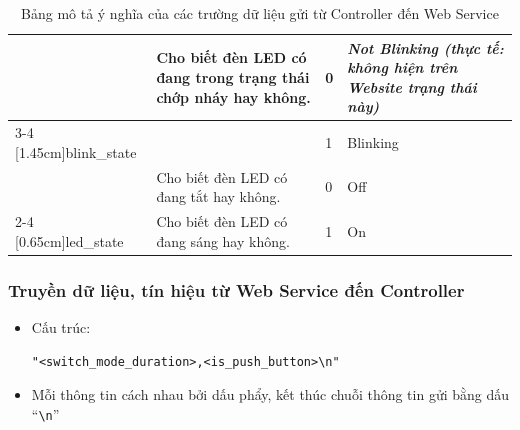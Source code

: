 \begin{table}[H]
\begin{tabular}{|p{4cm}|p{5cm}|p{2.5cm}|p{3.5cm}|}
{}                               & {Cho biết đèn LED có đang trong trạng thái chớp nháy hay không.}                                                                                                                                                                                                                                              & {0}                    & {\textit{Not Blinking (thực tế: không hiện trên Website trạng thái này)}} \\ \cline{3-4} 
\multirow{-2}{*}[1.45cm]{{blink\_state}} &{}                                                                                                                                  & {1}                    & {Blinking}                                                                \\ \hline
{}                               & {Cho biết đèn LED có đang tắt hay không.}                                                                                                                                                                                                       & {0}                    & {Off}                                                                     \\ \cline{2-4} 
\multirow{-2}{*}[0.65cm]{{led\_state}}   & {Cho biết đèn LED có đang sáng hay không.}                                                                                                                                                                                                      & {1}                    & {On}                                                                      \\ \hline
\end{tabular}
\caption{Bảng mô tả ý nghĩa của các trường dữ liệu gửi từ Controller đến Web Service}
\label{tab:my_label}
\end{table}

\subsubsection{Truyền dữ liệu, tín hiệu từ Web Service đến Controller}
\begin{itemize}
    \item Cấu trúc:
    \begin{lstlisting}
"<switch_mode_duration>,<is_push_button>\n"\end{lstlisting}
    \item Mỗi thông tin cách nhau bởi dấu phẩy, kết thúc chuỗi thông tin gửi bằng dấu “\verb|\n|”
\end{itemize}

